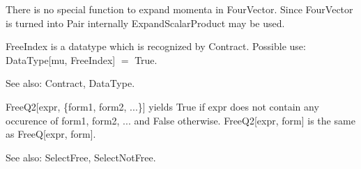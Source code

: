 \dispSFoutmath{
\mu 
}

\dispSFinmath{
\mu 
}








There is no special function to expand momenta in FourVector. Since FourVector is turned into Pair internally ExpandScalarProduct may be
  used.





FreeIndex is a datatype which is recognized by Contract. Possible use: DataType[mu, FreeIndex] \(=\) True.

See also:  Contract, DataType.



FreeQ2[expr, \{form1, form2, ...\}] yields True if expr does not contain any occurence of form1, form2, ... and False otherwise.
  FreeQ2[expr, form] is the same as FreeQ[expr, form].

See also:  SelectFree, SelectNotFree.







